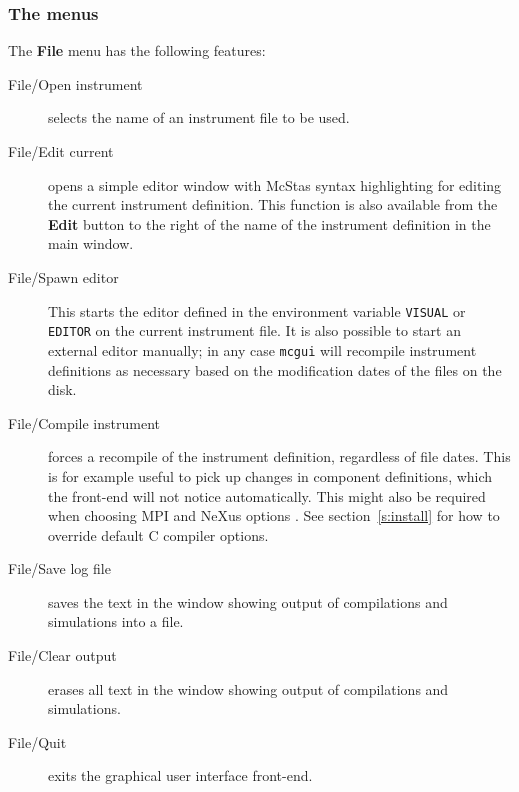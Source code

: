 \subsubsection{The menus}

The {\bf File} menu has the following features:
\begin{description}
\item[File/Open instrument] selects the name of an instrument file to be used.
\item[File/Edit current] opens a simple editor window with McStas syntax
  highlighting for editing the
  current instrument definition. This function is also available from
  the {\bf Edit} button to the right of the name of the instrument definition in
  the main window.
\item[File/Spawn editor] This starts the editor defined in the environment
  variable \verb+VISUAL+ or \verb+EDITOR+ on the current instrument
  file. It is also possible to start an external editor manually; in any
  case \verb+mcgui+ will recompile instrument definitions as necessary based on
  the modification dates of the files on the disk.
\item[File/Compile instrument] forces a recompile of the instrument
  definition, regardless of file dates. This is for example useful to
  pick up changes in component definitions, which the front-end will not
  notice automatically. This might also be required when choosing MPI  and NeXus options . See section~\ref{s:install} for how to override
  default C compiler options.
\item[File/Save log file] saves the text in the window showing output of
  compilations and simulations into a file.
\item[File/Clear output] erases all text in the window showing output of
  compilations and simulations.
\item[File/Quit] exits the graphical user interface front-end.
\end{description}

